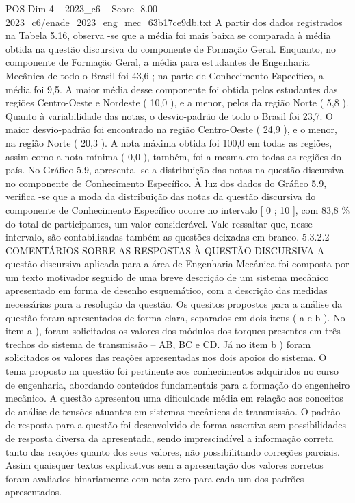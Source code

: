\begin{textsample}{POS Dim 4 – 2023\_c6 – Score -8.00 – 2023\_c6/enade\_2023\_eng\_mec\_63b17ce9db.txt}
A partir dos dados registrados na Tabela 5.16, observa -se que a média foi mais baixa se comparada à média obtida na questão discursiva do componente de Formação Geral.
Enquanto, no componente de Formação Geral, a média para estudantes de Engenharia Mecânica de todo o Brasil foi 43,6 ; na parte de Conhecimento Específico, a média foi 9,5.
A maior média desse componente foi obtida pelos estudantes das regiões Centro-Oeste e Nordeste ( 10,0 ), e a menor, pelos da região Norte ( 5,8 ).
Quanto à variabilidade das notas, o desvio-padrão de todo o Brasil foi 23,7.
O maior desvio-padrão foi encontrado na região Centro-Oeste ( 24,9 ), e o menor, na região Norte ( 20,3 ).
A nota máxima obtida foi 100,0 em todas as regiões, assim como a nota mínima ( 0,0 ), também, foi a mesma em todas as regiões do país.
No Gráfico 5.9, apresenta -se a distribuição das notas na questão discursiva no componente de Conhecimento Específico.
À luz dos dados do Gráfico 5.9, verifica -se que a moda da distribuição das notas da questão discursiva do componente de Conhecimento Específico ocorre no intervalo [ 0 ; 10 ], com 83,8 \% do total de participantes, um valor considerável.
Vale ressaltar que, nesse intervalo, são contabilizadas também as questões deixadas em branco. 5.3.2.2 COMENTÁRIOS SOBRE AS RESPOSTAS À QUESTÃO DISCURSIVA A questão discursiva aplicada para a área de Engenharia Mecânica foi composta por um texto motivador seguido de uma breve descrição de um sistema mecânico apresentado em forma de desenho esquemático, com a descrição das medidas necessárias para a resolução da questão.
Os quesitos propostos para a análise da questão foram apresentados de forma clara, separados em dois itens ( a e b ).
No item a ), foram solicitados os valores dos módulos dos torques presentes em três trechos do sistema de transmissão – AB, BC e CD.
Já no item b ) foram solicitados os valores das reações apresentadas nos dois apoios do sistema.
O tema proposto na questão foi pertinente aos conhecimentos adquiridos no curso de engenharia, abordando conteúdos fundamentais para a formação do engenheiro mecânico.
A questão apresentou uma dificuldade média em relação aos conceitos de análise de tensões atuantes em sistemas mecânicos de transmissão.
O padrão de resposta para a questão foi desenvolvido de forma assertiva sem possibilidades de resposta diversa da apresentada, sendo imprescindível a informação correta tanto das reações quanto dos seus valores, não possibilitando correções parciais.
Assim quaisquer textos explicativos sem a apresentação dos valores corretos foram avaliados binariamente com nota zero para cada um dos padrões apresentados.

\end{textsample}
